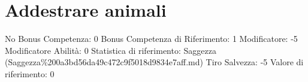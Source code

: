\section{Addestrare animali}\label{addestrare-animali}

\begin{description}
\tightlist
\item[Tags: ABI]
No Bonus Competenza: 0 Bonus Competenza di Riferimento: 1 Modificatore:
-5 Modificatore Abilità: 0 Statistica di riferimento: Saggezza
(Saggezza\%200a3bd56da49c472c9f5018d9834e7aff.md) Tiro Salvezza: -5
Valore di riferimento: 0
\end{description}
